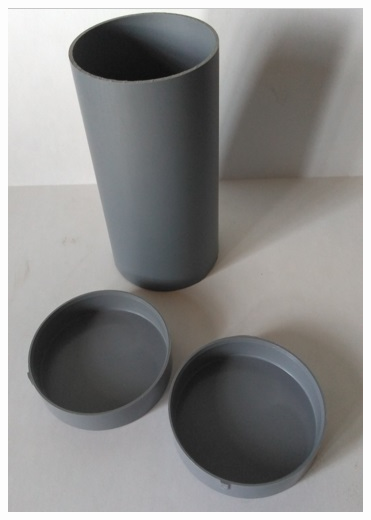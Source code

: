 \documentclass[12pt,letterpaper]{article}
\numberwithin{figure}{section}
\numberwithin{equation}{section}
\numberwithin{table}{section}
\begin{document}
 \begin{figure}[H]
     \centering
     \begin{minipage}{.45\textwidth}
     \centering
     \includegraphics[width=\linewidth]{Figuras/figure_24_a.jpg}
     \end{minipage}
     \centering
     \begin{minipage}{.45\textwidth}
     \centering

\end{minipage}
\end{figure}
\end{document}
